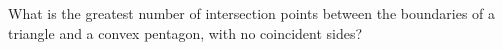 What is the greatest number of intersection points between the boundaries of a triangle and a convex pentagon, with no coincident sides?
